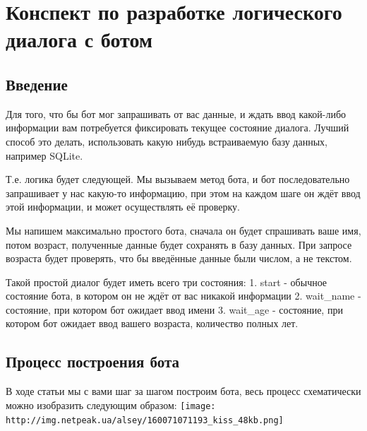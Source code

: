 \documentclass[
]{book}
\begin{document}
\section{Конспект по разработке логического диалога с ботом}\label{ux43aux43eux43dux441ux43fux435ux43aux442-ux43fux43e-ux440ux430ux437ux440ux430ux431ux43eux442ux43aux435-ux43bux43eux433ux438ux447ux435ux441ux43aux43eux433ux43e-ux434ux438ux430ux43bux43eux433ux430-ux441-ux431ux43eux442ux43eux43c}

\subsection{Введение}\label{ux432ux432ux435ux434ux435ux43dux438ux435-1}

Для того, что бы бот мог запрашивать от вас данные, и ждать ввод какой-либо информации вам потребуется фиксировать текущее состояние диалога. Лучший способ это делать, использовать какую нибудь встраиваемую базу данных, например SQLite.

Т.е. логика будет следующей. Мы вызываем метод бота, и бот последовательно запрашивает у нас какую-то информацию, при этом на каждом шаге он ждёт ввод этой информации, и может осуществлять её проверку.

Мы напишем максимально простого бота, сначала он будет спрашивать ваше имя, потом возраст, полученные данные будет сохранять в базу данных. При запросе возраста будет проверять, что бы введённые данные были числом, а не текстом.

Такой простой диалог будет иметь всего три состояния:
1. start - обычное состояние бота, в котором он не ждёт от вас никакой информации
2. wait\_name - состояние, при котором бот ожидает ввод имени
3. wait\_age - состояние, при котором бот ожидает ввод вашего возраста, количество полных лет.

\subsection{Процесс построения бота}\label{ux43fux440ux43eux446ux435ux441ux441-ux43fux43eux441ux442ux440ux43eux435ux43dux438ux44f-ux431ux43eux442ux430}

В ходе статьи мы с вами шаг за шагом построим бота, весь процесс схематически можно изобразить следующим образом:
\texttt{[image: http://img.netpeak.ua/alsey/160071071193\_kiss\_48kb.png]}
\end{document}
